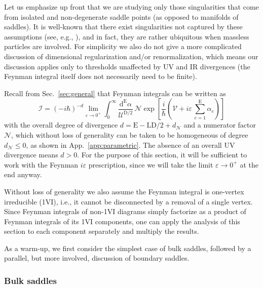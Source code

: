 \documentclass[12pt]{article}
\numberwithin{figure}{section}
\def \be {\begin{equation}}
\def \ee {\end{equation}}
\def \D {\mathrm{D}}
\def \E {\mathrm{E}}
\def \L {\mathrm{L}}
\def \U {\mathcal{U}}
\def \d {\mathrm{d}}
\def \eps {\varepsilon}
\def \V {\mathcal{V}}
\def \leq {\leqslant}
\def \I {\mathcal{I}}
\def \N {\mathcal{N}}
\begin{document}
	
	Let us emphasize up front that we are studying only those singularities that come from isolated and non-degenerate saddle points (as opposed to manifolds of saddles). It is well-known that there exist singularities not captured by these assumptions (see, e.g., \cite{doi:10.1063/1.1703752,Mizera:2021icv}), and in fact, they are rather ubiquitous when massless particles are involved. For simplicity we also do not give a more complicated discussion of dimensional regularization and/or renormalization, which means our discussion applies only to thresholds unaffected by UV and IR divergences (the Feynman integral itself does not necessarily need to be finite).
	
	Recall from Sec.~\ref{sec:general} that Feynman integrals can be written as
	\be
	\I = (-i\hbar)^{-d} \lim_{\eps \to 0^+} \int_0^\infty \frac{\d^{\E} \alpha}{\U^{\D/2}}\, \N \exp \left[ \frac{i}{\hbar} \left(\V + i\eps\, {\textstyle\sum_{e=1}^{\E}}\alpha_e\right)\right]
	\label{eq:FeynmanI}
	\ee
	with the overall degree of divergence $d = \E - \L\D/2 + d_\N$ and a numerator factor $\N$, which without loss of generality can be taken to be homogeneous of degree $d_\N \leq 0$, as shown in App.~\ref{app:parametric}. The absence of an overall UV divergence means $d > 0$. For the purpose of this section, it will be sufficient to work with the Feynman $i\eps$ prescription, since we will take the limit $\eps \to 0^+$ at the end anyway.
	
	Without loss of generality we also assume the Feynman integral is one-vertex irreducible (1VI), i.e., it cannot be disconnected by a removal of a single vertex. Since Feynman integrals of non-1VI diagrams simply factorize as a product of Feynman integrals of its 1VI components, one can apply the analysis of this section to each component separately and multiply the results.
	
	As a warm-up, we first consider the simplest case of bulk saddles, followed by a parallel, but more involved, discussion of boundary saddles.
	
	\subsubsection{Bulk saddles}
	
\end{document}
